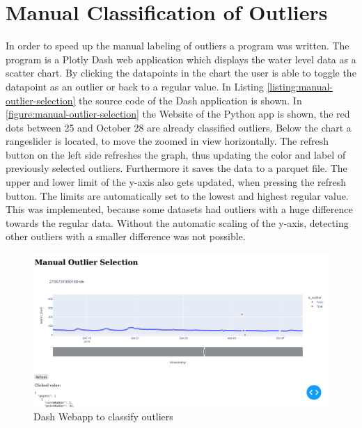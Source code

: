\section{Manual Classification of Outliers}
In order to speed up the manual labeling of outliers a program was written. The program is a Plotly Dash \cite{DashDocumentationUser}  web application which displays the water level data as a scatter chart. 
By clicking the datapoints in the chart the user is able to toggle the datapoint as an outlier or back to a regular value. 
In Listing \ref{listing:manual-outlier-selection} the source code of the Dash application is shown. 
In \autoref{figure:manual-outlier-selection} the Website of the Python app is shown, the red dots between 25 and October 28 are already classified outliers. Below the chart a rangeslider is located, to move the zoomed in view horizontally. 
The refresh button on the left side refreshes the graph, thus updating the color and label of previously selected outliers. Furthermore it saves the data to a parquet file.
The upper and lower limit of the y-axis also gets updated, when pressing the refresh button. 
The limits are automatically set to the lowest and highest regular value. 
This was implemented, because some datasets had outliers with a huge difference towards the regular data. 
Without the automatic scaling of the y-axis, detecting other outliers with a smaller difference was not possible.
\begin{figure}[H]
    \centering
    \includegraphics[width=\textwidth]{./pics/manual-outlier-selection.png}
    \caption{Dash Webapp to classify outliers}
    \label{figure:manual-outlier-selection}
\end{figure}

